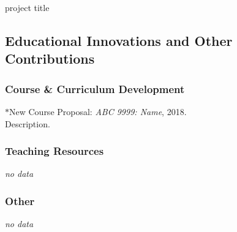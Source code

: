     \begin{subnum}
            {project title}
    \end{subnum}

\subsection{Educational Innovations and Other Contributions}
\label{subsec:curriculum}
    \subsubsection{Course \& Curriculum Development}
        \begin{subnum}
            \item   $\ast$New Course Proposal: \textit{ABC 9999: Name}, 2018.\\
                    Description.
        \end{subnum}
    
    \subsubsection{Teaching Resources}
        \begin{subnum}
            \item[] \textsl{no data}
        \end{subnum}
        
    \subsubsection{Other}
        \begin{subnum}
            \item[] \textsl{no data}
        \end{subnum}






